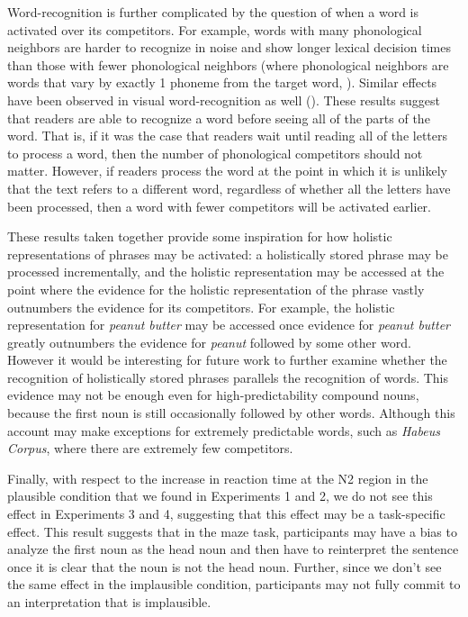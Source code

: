 \documentclass[
  12pt,
  letterpaper,
]{scrreport}
\begin{document}
Word-recognition is further complicated by the question of when a word
is activated over its competitors. For example, words with many
phonological neighbors are harder to recognize in noise and show longer
lexical decision times than those with fewer phonological neighbors
(where phonological neighbors are words that vary by exactly 1 phoneme
from the target word,
). Similar effects have been observed in visual word-recognition as
well (). These
results suggest that readers are able to recognize a word before seeing
all of the parts of the word. That is, if it was the case that readers
wait until reading all of the letters to process a word, then the number
of phonological competitors should not matter. However, if readers
process the word at the point in which it is unlikely that the text
refers to a different word, regardless of whether all the letters have
been processed, then a word with fewer competitors will be activated
earlier.

These results taken together provide some inspiration for how holistic
representations of phrases may be activated: a holistically stored
phrase may be processed incrementally, and the holistic representation
may be accessed at the point where the evidence for the holistic
representation of the phrase vastly outnumbers the evidence for its
competitors. For example, the holistic representation for \emph{peanut
butter} may be accessed once evidence for \emph{peanut butter} greatly
outnumbers the evidence for \emph{peanut} followed by some other word.
However it would be interesting for future work to further examine
whether the recognition of holistically stored phrases parallels the
recognition of words. This evidence may not be enough even for
high-predictability compound nouns, because the first noun is still
occasionally followed by other words. Although this account may make
exceptions for extremely predictable words, such as \emph{Habeus
Corpus}, where there are extremely few competitors.

Finally, with respect to the increase in reaction time at the N2 region
in the plausible condition that we found in Experiments 1 and 2, we do
not see this effect in Experiments 3 and 4, suggesting that this effect
may be a task-specific effect. This result suggests that in the maze
task, participants may have a bias to analyze the first noun as the head
noun and then have to reinterpret the sentence once it is clear that the
noun is not the head noun. Further, since we don't see the same effect
in the implausible condition, participants may not fully commit to an
interpretation that is implausible.
\end{document}
